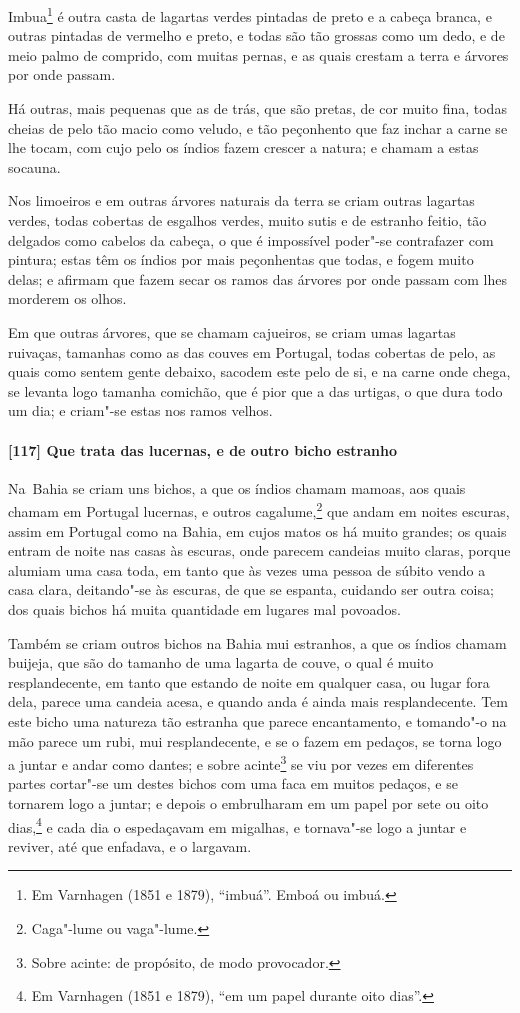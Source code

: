 \begin{linenumbers}
Imbua\footnote{ Em Varnhagen (1851 e 1879), ``imbuá''. Emboá ou imbuá.} é outra casta de
lagartas verdes pintadas de preto e a cabeça branca, e outras pintadas de vermelho e
preto, e todas são tão grossas como um dedo, e de meio palmo de comprido, com muitas
pernas, e as quais crestam a terra e árvores por onde passam.

Há outras, mais pequenas que as de trás, que são pretas, de cor muito fina, todas cheias
de pelo tão macio como veludo, e tão peçonhento que faz inchar a carne se lhe tocam, com
cujo pelo os índios fazem crescer a natura; e chamam a estas socauna.

Nos limoeiros e em outras árvores naturais da terra se criam outras lagartas verdes, todas
cobertas de esgalhos verdes, muito sutis e de estranho feitio, tão delgados como cabelos
da cabeça, o que é impossível poder"-se contrafazer com pintura; estas têm os índios por
mais peçonhentas que todas, e fogem muito delas; e afirmam que fazem secar os ramos das
árvores por onde passam com lhes morderem os olhos.

Em que outras árvores, que se chamam cajueiros, se criam umas lagartas ruivaças, tamanhas
como as das couves em Portugal, todas cobertas de pelo, as quais como sentem gente
debaixo, sacodem este pelo de si, e na carne onde chega, se levanta logo tamanha comichão,
que é pior que a das urtigas, o que dura todo um dia; e criam"-se estas nos ramos velhos.

\paragraph{[117] Que trata das lucernas, e de outro bicho estranho}\quad
\mbox{Na Bahia} se criam uns bichos, a que os índios chamam mamoas, aos quais chamam em Portugal
lucernas, e outros cagalume,\footnote{ Caga"-lume ou vaga"-lume.} que andam em noites
escuras, assim em Portugal como na Bahia, em cujos matos os há muito grandes; os quais
entram de noite nas casas às escuras, onde parecem candeias muito claras, porque alumiam
uma casa toda, em tanto que às vezes uma pessoa de súbito vendo a casa clara, deitando"-se
às escuras, de que se espanta, cuidando ser outra coisa; dos quais bichos há muita
quantidade em lugares mal povoados.

Também se criam outros bichos na Bahia mui estranhos, a que os índios chamam buijeja, que
são do tamanho de uma lagarta de couve, o qual é muito resplandecente, em tanto que
estando de noite em qualquer casa, ou lugar fora dela, parece uma candeia acesa, e quando
anda é ainda mais resplandecente. Tem este bicho uma natureza tão estranha que parece
encantamento, e tomando"-o na mão parece um rubi, mui resplandecente, e se o fazem em
pedaços, se torna logo a juntar e andar como dantes; e sobre acinte\footnote{ Sobre
acinte: de propósito, de modo provocador.} se viu por vezes em diferentes partes 
cortar"-se um destes bichos com uma faca em muitos pedaços, e se tornarem logo a
juntar; e depois o embrulharam em um papel por sete ou oito dias,\footnote{ Em Varnhagen
(1851 e 1879), ``em um papel durante oito dias''.} e cada dia o espedaçavam em migalhas, e
tornava"-se logo a juntar e reviver, até que enfadava, e o largavam.


\end{linenumbers}
